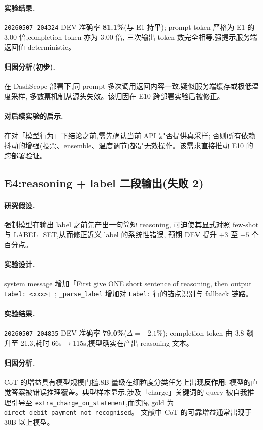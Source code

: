 \documentclass[11pt,a4paper]{ctexart}
\begin{document}
\paragraph{实验结果.}\texttt{20260507\_204324} DEV 准确率 \textbf{81.1\%}(与 E1 持平);
prompt token 严格为 E1 的 $3.00$ 倍,completion token 亦为 $3.00$ 倍,
三次输出 token 数完全相等,强提示服务端返回值 deterministic。

\paragraph{归因分析(初步).}在 DashScope 部署下,同 prompt 多次调用返回内容一致,疑似服务端缓存或极低温度采样,
多数票机制从源头失效。该归因在 E10 跨部署实验后被修正。

\paragraph{对后续实验的启示.}在对「模型行为」下结论之前,需先确认当前 API 是否提供真采样;
否则所有依赖抖动的增强(投票、ensemble、温度调节)都是无效操作。该需求直接推动 E10 的跨部署验证。

\subsection{E4:reasoning + label 二段输出(失败 2)}

\paragraph{研究假设.}强制模型在输出 label 之前先产出一句简短 reasoning,
可迫使其显式对照 few-shot 与 LABEL\_SET,从而修正近义 label 的系统性错误,
预期 DEV 提升 $+3$ 至 $+5$ 个百分点。

\paragraph{实验设计.}system message 增加「First give ONE short sentence of reasoning, then output \texttt{Label: <xxx>}」;
\texttt{\_parse\_label} 增加对 \texttt{Label:} 行的锚点识别与 fallback 链路。

\paragraph{实验结果.}\texttt{20260507\_204835} DEV 准确率 \textbf{79.0\%}($\Delta = -2.1\%$);
completion token 由 3.8 飙升至 21.3,耗时 66s$\rightarrow$115s,模型确实在产出 reasoning 文本。

\paragraph{归因分析.}CoT 的增益具有模型规模门槛,8B 量级在细粒度分类任务上出现\textbf{反作用}:
模型的直觉答案被错误推理覆盖。典型样本显示,涉及「charge」关键词的 query 被自我推理引导至
\texttt{extra\_charge\_on\_statement},而实际 gold 为 \texttt{direct\_debit\_payment\_not\_recognised}。
文献中 CoT 的可靠增益通常出现于 30B 以上模型。
\end{document}
